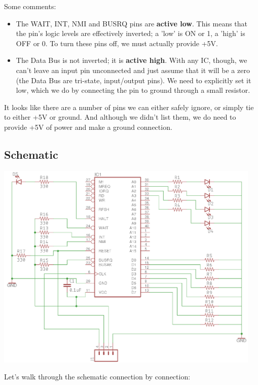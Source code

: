 Some comments:

\begin{itemize}
\item The WAIT, INT, NMI and BUSRQ pins are \textbf{active low}. This means that the pin's logic levels are effectively inverted; a 'low' is ON or 1, a 'high' is OFF or 0. To turn these pins off, we must actually provide +5V. 
\item The Data Bus is not inverted; it is \textbf{active high}. With any IC, though, we can't leave an input pin unconnected and just assume that it will be a zero (the Data Bus are tri-state, input/output pins). We need to explicitly set it low, which we do by connecting the pin to ground through a small resistor.
\end{itemize}

It looks like there are a number of pins we can either safely ignore, or simply tie to either +5V or ground. And although we didn't list them, we do need to provide +5V of power and make a ground connection. 

\subsection{Schematic}
\begin{center}
\includegraphics[height=10cm]{first_z80_schematic.png}
\end{center}

Let's walk through the schematic connection by connection:

